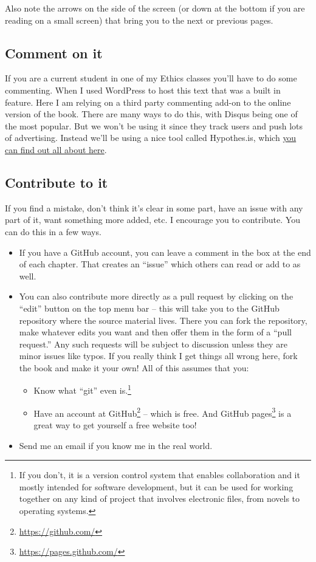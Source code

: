 \documentclass[
  12pt, openany]{book}
\providecommand{\tightlist}{%
  \setlength{\itemsep}{0pt}\setlength{\parskip}{0pt}}
\renewcommand{\href}[2]{#2\footnote{\url{#1}}}
\begin{document}
Also note the arrows on the side of the screen (or down at the bottom if you are reading on a small screen) that bring you to the next or previous pages.

\hypertarget{comment-on-it}{%
\subsection*{Comment on it}\label{comment-on-it}}


If you are a current student in one of my Ethics classes you'll have to do some commenting. When I used WordPress to host this text that was a built in feature. Here I am relying on a third party commenting add-on to the online version of the book. There are many ways to do this, with Disqus being one of the most popular. But we won't be using it since they track users and push lots of advertising. Instead we'll be using a nice tool called Hypothes.is, which \protect\hyperlink{appendix-1}{you can find out all about here}.

\hypertarget{contribute}{%
\subsection*{Contribute to it}\label{contribute}}


If you find a mistake, don't think it's clear in some part, have an issue with any part of it, want something more added, etc. I encourage you to contribute. You can do this in a few ways.

\begin{itemize}
\tightlist
\item
  If you have a GitHub account, you can leave a comment in the box at the end of each chapter. That creates an ``issue'' which others can read or add to as well.
\item
  You can also contribute more directly as a pull request by clicking on the ``edit'' button on the top menu bar -- this will take you to the GitHub repository where the source material lives. There you can fork the repository, make whatever edits you want and then offer them in the form of a ``pull request.'' Any such requests will be subject to discussion unless they are minor issues like typos. If you really think I get things all wrong here, fork the book and make it your own! All of this assumes that you:

  \begin{itemize}
  \tightlist
  \item
    Know what ``git'' even is.\footnote{If you don't, it is a version control system that enables collaboration and it mostly intended for software development, but it can be used for working together on any kind of project that involves electronic files, from novels to operating systems.}
  \item
    Have an account at \href{https://github.com/}{GitHub} -- which is free. And \href{https://pages.github.com/}{GitHub pages} is a great way to get yourself a free website too!
  \end{itemize}
\item
  Send me an email if you know me in the real world.
\end{itemize}
\end{document}
